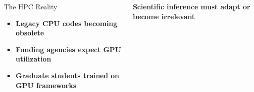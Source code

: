 \documentclass[aspectratio=169]{beamer}
\begin{document}
\begin{frame}
\begin{columns}
\begin{block}{The HPC Reality}
\begin{itemize}
                \item \textbf{Legacy CPU codes becoming obsolete}
                \item \textbf{Funding agencies expect GPU utilization}
                \item \textbf{Graduate students trained on GPU frameworks}
            \end{itemize}
        \end{block}
        \vspace{10pt}
        \begin{center}
            \textbf{Scientific inference must adapt or become irrelevant}
        \end{center}
    \end{columns}
\end{frame}
\end{document}
